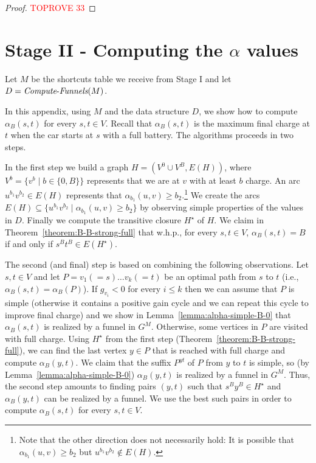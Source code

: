 \documentclass[11pt]{article}
\newcommand{\ComputeF}{\mbox{{\it Compute}-{\it Funnels}}}
\begin{document}
\begin{proof}\textcolor{red}{TOPROVE 33}\end{proof}


\section{Stage II - Computing the \texorpdfstring{$\alpha$}{alpha} values}\label{S-algorithm}
Let $M$ be the shortcuts table we receive from Stage I and let $D = \ComputeF(M)$.

In this appendix, using $M$ and the data structure $D$, we show how to compute $\alpha_B(s,t)$ for every $s,t\in V$. Recall that $\alpha_B(s,t)$ is the maximum final charge at $t$ when the car starts at $s$ with a full battery. The algorithms proceeds in two steps.

In the first step we build a graph $H = (V^0 \cup V^B, E(H))$, where $V^b = \{v^b \mid b\in \{0,B\} \}$ represents that we are at $v$ with at least $b$ charge.  An arc $u^{b_1} v^{b_2}\in E(H)$ represents that $\alpha_{b_1}(u,v) \ge b_2$.\footnote{Note that the other direction does not necessarily hold: It is possible that $\alpha_{b_1}(u,v) \ge b_2$ but $u^{b_1} v^{b_2}\notin E(H)$.} We create the arcs $E(H) \subseteq \{u^{b_1} v^{b_2} \mid  \alpha_{b_1}(u,v) \ge b_2\}$ by observing simple properties of the values in $D$. Finally we 
compute the 
transitive closure $H^\star$ of $H$. We claim in Theorem~\ref{theorem:B-B-strong-full} that w.h.p., for every $s,t\in V$, $\alpha_B(s,t)=B$ if and only if $s^B t^B \in E(H^\star)$.

The second (and final) step is based on combining the following observations. Let $s,t \in V$ and let $P= v_1 (=s) \ldots v_k(=t)$ be an optimal path  from $s$ to $t$ (i.e., $\alpha_B(s,t)=\alpha_B(P)$). If $g_{v_i} < 0$ for every $i\le k$ then we can assume that $P$ is simple (otherwise it contains a positive gain cycle and we can repeat this cycle to improve final charge) and we show in Lemma~\ref{lemma:alpha-simple-B-0} that $\alpha_B(s,t)$ is realized by a funnel in $G^M$. Otherwise, some vertices in $P$ are visited with full charge. Using $H^\star$ from the first step (Theorem~\ref{theorem:B-B-strong-full}), we can find the last vertex $y\in P$ that is reached with full charge and compute $\alpha_B(y,t)$. We claim that the suffix $P^{yt}$ of $P$ from $y$ to $t$ is simple, so (by Lemma~\ref{lemma:alpha-simple-B-0})  $\alpha_B(y,t)$ is realized by a funnel in $G^M$. Thus, the second step amounts to finding pairs $(y,t)$ such that $s^B y^B \in H^\star$ and $\alpha_B(y,t)$ can be realized by a funnel. We use the best such pairs in order to compute $\alpha_B(s,t)$ for every $s,t\in V$.   
\end{document}

